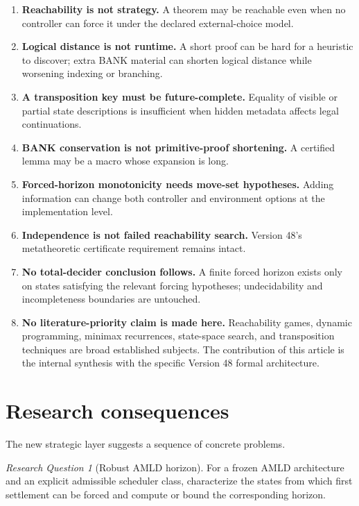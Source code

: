 \documentclass[11pt]{article}
\theoremstyle{remark}
\newtheorem{question}[definition]{Research Question}
\begin{document}
\begin{enumerate}[label=\textbf{B\arabic*.},leftmargin=3em]
\item \textbf{Reachability is not strategy.} A theorem may be reachable even when no controller can force it under the declared external-choice model.
\item \textbf{Logical distance is not runtime.} A short proof can be hard for a heuristic to discover; extra BANK material can shorten logical distance while worsening indexing or branching.
\item \textbf{A transposition key must be future-complete.} Equality of visible or partial state descriptions is insufficient when hidden metadata affects legal continuations.
\item \textbf{BANK conservation is not primitive-proof shortening.} A certified lemma may be a macro whose expansion is long.
\item \textbf{Forced-horizon monotonicity needs move-set hypotheses.} Adding information can change both controller and environment options at the implementation level.
\item \textbf{Independence is not failed reachability search.} Version 48's metatheoretic certificate requirement remains intact.
\item \textbf{No total-decider conclusion follows.} A finite forced horizon exists only on states satisfying the relevant forcing hypotheses; undecidability and incompleteness boundaries are untouched.
\item \textbf{No literature-priority claim is made here.} Reachability games, dynamic programming, minimax recurrences, state-space search, and transposition techniques are broad established subjects. The contribution of this article is the internal synthesis with the specific Version 48 formal architecture.
\end{enumerate}

\section{Research consequences}

The new strategic layer suggests a sequence of concrete problems.

\begin{question}[Robust AMLD horizon]
For a frozen AMLD architecture and an explicit admissible scheduler class, characterize the states from which first settlement can be forced and compute or bound the corresponding horizon.
\end{question}
\end{document}
